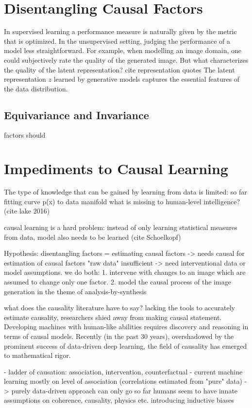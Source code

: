 \section{Disentangling Causal Factors}
	In supervised learning a performance measure is naturally given by the metric that is optimized. In the unsupervised setting, judging the performance of a model less straightforward. For example, when modelling an image domain, one could subjectively rate the quality of the generated image. But what characterizes the quality of the latent representation?
	cite representation quotes
	The latent representation $z$ learned by generative models captures the essential features of the data distribution.


	\subsection{Equivariance and Invariance}
		factors should

\section{Impediments to Causal Learning}
	The type of knowledge that can be gained by learning from data is limited:
	so far fitting curve p(x) to data manifold
	what is missing to human-level intelligence? (cite lake 2016)

	causal learning is a hard problem: instead of only learning statistical measures from data, model also needs to be learned (cite Schoelkopf)

	Hypothesis: disentangling factors = estimating causal factors -> needs causal
	for estimation of causal factors "raw data" insufficient -> need interventional data or model assumptions.
	we do both:
	1. intervene with changes to an image which are assumed to change only one factor.
	2. model the causal process of the image generation in the theme of analysis-by-synthesis

	what does the causality literature have to say?
	lacking the tools to accurately estimate causality, researchers shied away from making causal statement. Developing machines with human-like abilities requires discovery and reasoning in terms of causal models. Recently (in the past 30 years), overshadowed by the prominent success of data-driven deep learning, the field of causality has emerged to mathematical rigor.

	- ladder of causation: association, intervention, counterfactual
	- current machine learning mostly on level of association (correlations estimated from "pure" data)
	-> purely data-driven approach can only go so far
	humans seem to have innate assumptions on coherence, causality, physics etc. introducing inductive biases



